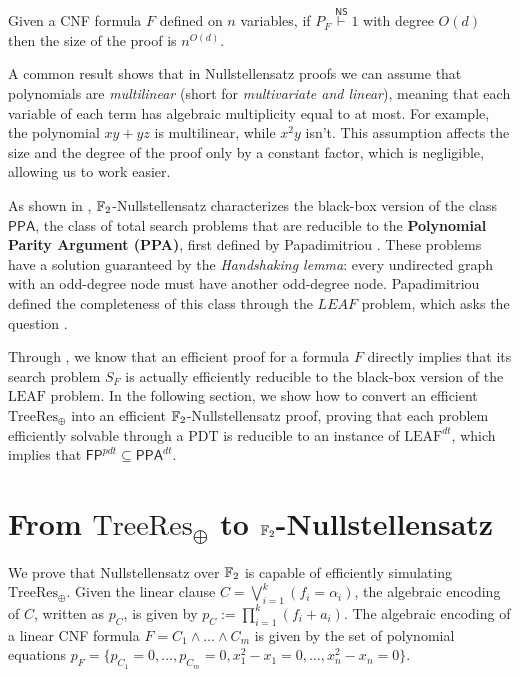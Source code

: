 \begin{proposition}
    \label{degree_size}
 Given a CNF formula $F$ defined on $n$ variables, if $P_F \stackrel{\mathsf{NS}}{\vdash} 1$ with degree $O(d)$ then the size of the proof is $n^{O(d)}$.
\end{proposition}

A common result shows that in Nullstellensatz proofs we can assume that polynomials are \textit{multilinear} (short for \textit{multivariate and linear}), meaning that each variable of each term has algebraic multiplicity equal to at most. For example, the polynomial $xy+yz$ is multilinear, while $x^2y$ isn't. This assumption affects the size and the degree of the proof only by a constant factor, which is negligible, allowing us to work easier.

As shown in , $\mathbb{F}_2$-Nullstellensatz characterizes the black-box version of the class $\mathsf{PPA}$, the class of total search problems that are reducible to the \textbf{Polynomial Parity Argument (PPA)}, first defined by Papadimitriou \cite{PPA_complexity}. These problems have a solution guaranteed by the \textit{Handshaking lemma}: every undirected graph with an odd-degree node must have another odd-degree node. Papadimitriou defined the completeness of this class through the $LEAF$ problem, which asks the question .

Through , we know that an efficient proof for a formula $F$ directly implies that its search problem $S_F$ is actually efficiently reducible to the black-box version of the $\mathrm{LEAF}$ problem. In the following section, we show how to convert an efficient $\mathrm{TreeRes}_\oplus$ into an efficient $\mathbb{F}_2$-Nullstellensatz proof, proving that each problem efficiently solvable through a PDT is reducible to an instance of $\mathrm{LEAF}^{dt}$, which implies that $\mathsf{FP}^{pdt} \subseteq \mathsf{PPA}^{dt}$.

\section{From $\mathrm{TreeRes}_\oplus$ to $\mathbb{F}_2$-Nullstellensatz}

We prove that Nullstellensatz over $\mathbb{F}_2$ is capable of efficiently simulating $\mathrm{TreeRes}_\oplus$. Given the linear clause $C = \bigvee_{i = 1}^k (f_i = \alpha_i)$, the algebraic encoding of $C$, written as $p_C$, is given by $p_C := \prod_{i = 1}^{k} (f_i + a_i)$. The algebraic encoding of a linear CNF formula $F = C_1 \land \ldots \land C_m$ is given by the set of polynomial equations $p_F = \{p_{C_1} = 0, \ldots, p_{C_m} = 0, x_1^2-x_1 = 0, \ldots, x_n^2-x_n = 0\}$.

